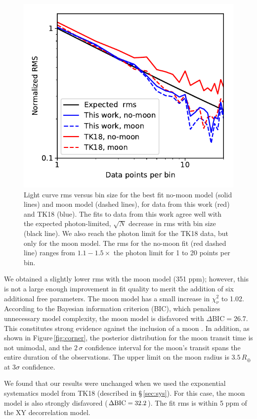 \documentclass[twocolumn]{aastex62}
\begin{document}
\begin{figure}
\includegraphics[width = 0.5 \textwidth]{fig4_rms.pdf}
    \caption{Light curve rms versus bin size for the best fit no-moon model (solid lines) and moon model (dashed lines), for data from this work (red) and TK18 (blue). The fits to data from this work agree well with the expected photon-limited, $\sqrt{N}$ decrease in rms with bin size (black line).  We also reach the photon limit for the TK18 data, but only for the moon model. The rms for the no-moon fit (red dashed line) ranges from $1.1 - 1.5\times$ the photon limit for 1 to 20 points per bin.}
 \label{fig:rms}
\end{figure}

We obtained a slightly lower rms with the moon model (351 ppm); however, this is not a large enough improvement in fit quality to merit the addition of six additional free parameters.  The moon model has a small increase in $\chi^2_\nu$ to 1.02. According to the Bayesian information criterion (BIC), which penalizes unnecessary model complexity, the moon model is disfavored with $\Delta\mathrm{BIC} = 26.7$. This constitutes strong evidence against the inclusion of a moon \citep{kass95}.  In addition, as shown in Figure\,\ref{fig:corner}, the posterior distribution for the moon transit time is not unimodal, and the $2\,\sigma$ confidence interval for the moon's transit spans the entire duration of the observations.  The upper limit on the moon radius is $3.5\,R_\oplus$ at $3\sigma$ confidence.


We found that our results were unchanged when we used the exponential systematics model from TK18 (described in \S\,\ref{sec:sys}). For this case, the moon model is also strongly disfavored ($\Delta\rm{BIC} = 32.2$). The fit rms is within 5 ppm of the XY decorrelation model. 
\end{document}
